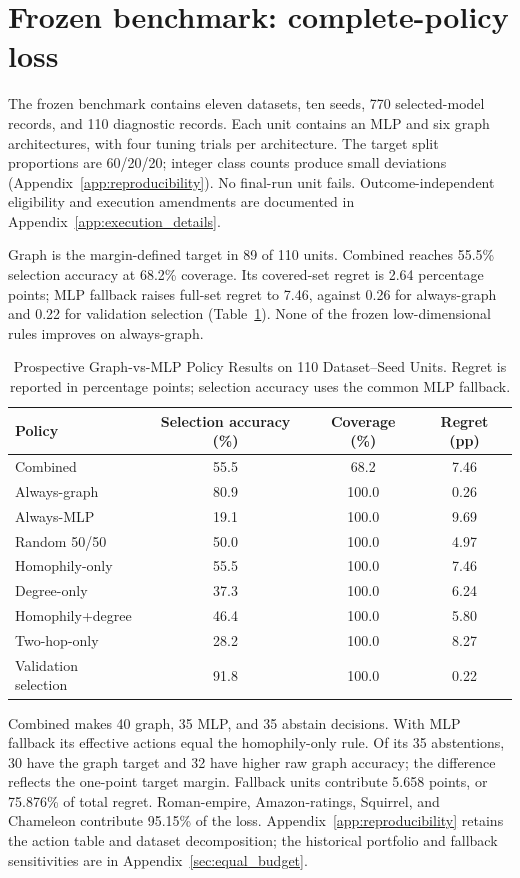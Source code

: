 \section{Frozen benchmark: complete-policy loss}
\label{sec:prospective}

The frozen benchmark contains eleven datasets, ten seeds, 770 selected-model records, and 110 diagnostic records. Each unit contains an MLP and six graph architectures, with four tuning trials per architecture. The target split proportions are 60/20/20; integer class counts produce small deviations (Appendix~\ref{app:reproducibility}). No final-run unit fails. Outcome-independent eligibility and execution amendments are documented in Appendix~\ref{app:execution_details}.

Graph is the margin-defined target in 89 of 110 units. Combined reaches 55.5\% selection accuracy at 68.2\% coverage. Its covered-set regret is 2.64 percentage points; MLP fallback raises full-set regret to 7.46, against 0.26 for always-graph and 0.22 for validation selection (Table~\ref{tab:prospective_policy_results}). None of the frozen low-dimensional rules improves on always-graph.
\begin{table}[t]
\centering
\caption{Prospective Graph-vs-MLP Policy Results on 110 Dataset--Seed Units. Regret is reported in percentage points; selection accuracy uses the common MLP fallback.}
\label{tab:prospective_policy_results}
\small
\setlength{\tabcolsep}{3.5pt}
\begin{tabular}{@{}lccc@{}}
\toprule
Policy & Selection accuracy (\%) & Coverage (\%) & Regret (pp) \\
\midrule
Combined & 55.5 & 68.2 & 7.46 \\
Always-graph & 80.9 & 100.0 & 0.26 \\
Always-MLP & 19.1 & 100.0 & 9.69 \\
Random 50/50 & 50.0 & 100.0 & 4.97 \\
Homophily-only & 55.5 & 100.0 & 7.46 \\
Degree-only & 37.3 & 100.0 & 6.24 \\
Homophily+degree & 46.4 & 100.0 & 5.80 \\
Two-hop-only & 28.2 & 100.0 & 8.27 \\
Validation selection & 91.8 & 100.0 & 0.22 \\
\bottomrule
\end{tabular}
\end{table}

Combined makes 40 graph, 35 MLP, and 35 abstain decisions. With MLP fallback its effective actions equal the homophily-only rule. Of its 35 abstentions, 30 have the graph target and 32 have higher raw graph accuracy; the difference reflects the one-point target margin. Fallback units contribute 5.658 points, or 75.876\% of total regret. Roman-empire, Amazon-ratings, Squirrel, and Chameleon contribute 95.15\% of the loss. Appendix~\ref{app:reproducibility} retains the action table and dataset decomposition; the historical portfolio and fallback sensitivities are in Appendix~\ref{sec:equal_budget}.

